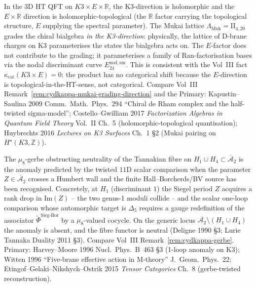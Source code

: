 \begin{remark}
\label{rem:htpo-mukai-direction}
In the 3D HT QFT on $K3\times E\times \mathbb{R}$, the K3-direction
is holomorphic and the $E\times \mathbb{R}$ direction is
holomorphic-topological (the $\mathbb{R}$ factor carrying the
topological structure, $E$ supplying the spectral parameter). The
Mukai lattice $\Lambda_{\mathrm{Muk}} = \mathrm{II}_{4,20}$ grades
the chiral bialgebra \emph{in the K3-direction}: physically, the
lattice of D-brane charges on K3 parameterises the states the
bialgebra acts on. The $E$-factor does not contribute to the
grading; it parameterises a family of Ran-factorisation bases via
the nodal discriminant curve $E^{\mathrm{nod,sm}}_{24}$. This is
consistent with the Vol~III fact
$\kappa_{\mathrm{cat}}(K3\times E) = 0$: the product has no
categorical shift because the $E$-direction is topological-in-the-HT-sense,
not categorical. Compare Vol~III
Remark~\ref{rem:cydkappa-mukai-grading-direction} and the
Primary:
Kapustin--Saulina 2009 Comm.~Math.~Phys.~294 ``Chiral de Rham complex
and the half-twisted sigma-model''; Costello--Gwilliam 2017
\emph{Factorization Algebras in Quantum Field Theory} Vol.~II Ch.~5
(holomorphic-topological quantisation); Huybrechts 2016
\emph{Lectures on K3 Surfaces} Ch.~1 \S2 (Mukai pairing on
$H^\star(K3,\mathbb Z)$).
\end{remark}

\begin{remark}
\label{rem:htpo-gerbe-physical}
The $\mu_8$-gerbe obstructing neutrality of the Tannakian fibre on
$H_1 \cup H_4 \subset \overline{\mathcal A}_2$ is the anomaly predicted
by the twisted $11$D scalar comparison when the parameter
$Z\in\overline{\mathcal A}_2$ crosses a Humbert wall and the
finite Hall--Borcherds/BV source has been recognised.
Concretely, at $H_1$ (discriminant $1$) the Siegel period $Z$
acquires a rank drop in $\mathrm{Im}(Z)$ -- the two genus-1 moduli
collide -- and the scalar one-loop comparison whose automorphic target
is $\Delta_5$ requires a gauge redefinition of the
associator $\widetilde{\Phi}^{\mathrm{Sieg\text{-}Bor}}$ by a
$\mu_8$-valued cocycle. On the generic locus
$\overline{\mathcal A_2}\setminus(H_1\cup H_4)$ the anomaly is
absent, and the fibre functor is neutral
(Deligne 1990 \S3; Lurie Tannaka Duality 2011 \S3).
Compare Vol~III Remark~\ref{rem:cydkappa-gerbe}. Primary:
Harvey--Moore 1996 Nucl.~Phys.~B~463 \S3 (1-loop anomaly on K3);
Witten 1996 ``Five-brane effective action in M-theory'' J.~Geom.~Phys.~22;
Etingof--Gelaki--Nikshych--Ostrik 2015 \emph{Tensor Categories}
Ch.~8 (gerbe-twisted reconstruction).
\end{remark}

